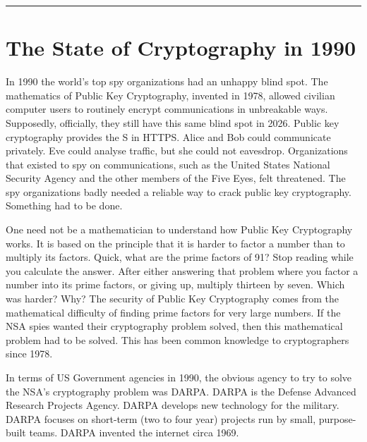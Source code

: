 \vspace{1cm}\noindent\rule{0.5\textwidth}{0.5pt}\vspace{0.5cm}

\section*{The State of Cryptography in 1990}
\label{pos09:the-state-of-cryptography-in-1990}


In 1990 the world's top spy organizations had an unhappy blind spot.  The mathematics of Public Key Cryptography, invented in 1978, allowed civilian computer users to routinely encrypt communications in unbreakable ways.  Supposedly, officially, they still have this same blind spot in 2026.  Public key cryptography provides the S in HTTPS.  Alice and Bob could communicate privately.  Eve could analyse traffic, but she could not eavesdrop.  Organizations that existed to spy on communications, such as the United States National Security Agency and the other members of the Five Eyes, felt threatened.  The spy organizations badly needed a reliable way to crack public key cryptography. Something had to be done.

One need not be a mathematician to understand how Public Key Cryptography works.  It is based on the principle that it is harder to factor a number than to multiply its factors.  Quick, what are the prime factors of 91?  Stop reading while you calculate the answer.  After either answering that problem where you factor a number into its prime factors, or giving up, multiply thirteen by seven.  Which was harder?  Why?  The security of Public Key Cryptography comes from the mathematical difficulty of finding prime factors for very large numbers.  If the NSA spies wanted their cryptography problem solved, then this mathematical problem had to be solved.  This has been common knowledge to cryptographers since 1978.

In terms of US Government agencies in 1990, the obvious agency to try to solve the NSA's cryptography problem was DARPA.  DARPA is the Defense Advanced Research Projects Agency.  DARPA develops new technology for the military.  DARPA focuses on short-term (two to four year) projects run by small, purpose-built teams.  DARPA invented the internet circa 1969.

